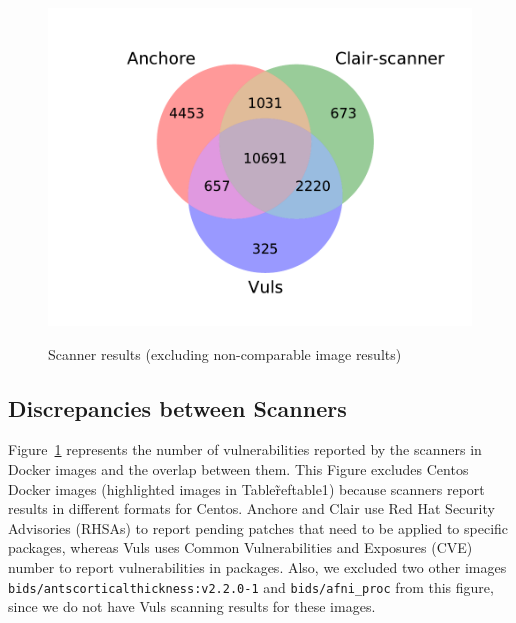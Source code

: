 \documentclass[a4paper,num-refs]{oup-contemporary}
\begin{document}
\begin{figure}[!ht]
        {\includegraphics[scale=2.5,width=\columnwidth]
        {Figures/venn.pdf}}
	\vspace*{-10mm}
	\caption{\label{fig:venn} Scanner results (excluding non-comparable image results)}
\end{figure}


\subsection{Discrepancies between Scanners}

Figure~\ref{fig:venn} represents the number of vulnerabilities reported by
the scanners in Docker images and the overlap between them.
This Figure excludes Centos Docker images (highlighted images in Table\~ref{table1}) because scanners report results in different
formats for Centos. Anchore and Clair use Red Hat Security Advisories (RHSAs)
to report pending patches that need to be applied to specific packages,
whereas Vuls uses Common Vulnerabilities and Exposures (CVE) number to report
vulnerabilities in packages. Also, we excluded two other images \texttt{bids/antscorticalthickness:v2.2.0-1} and
\texttt{bids/afni\_proc} from this figure, since we do not have Vuls scanning results for these images. 
\end{document}

